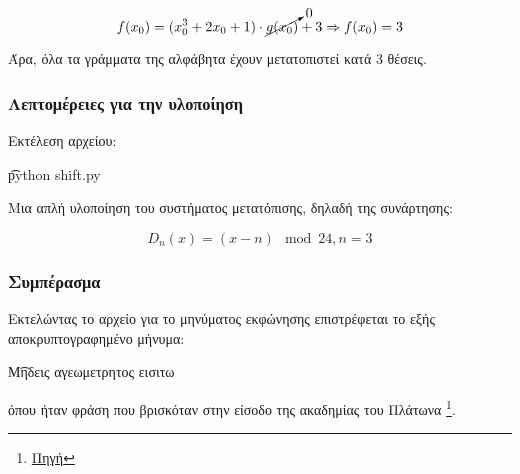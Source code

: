 \begin{equation} \label{eq:123}
    f(x_0) = (x_{0}^3+2x_0+1) \cdot \cancelto{0}{g(x_0)} + 3 \Rightarrow f(x_0) = 3
\end{equation}

Άρα, όλα τα γράμματα της αλφάβητα έχουν μετατοπιστεί κατά 3 θέσεις.

\subsubsection{Λεπτομέρειες για την υλοποίηση}

Εκτέλεση αρχείου:

\begin{center}
    \t{python shift.py}
\end{center}

Μια απλή υλοποίηση του συστήματος μετατόπισης, δηλαδή της συνάρτησης:

\begin{equation}
    D_n(x) = (x - n) \mod 24, n = 3
\end{equation}

\subsubsection{Συμπέρασμα}

Εκτελώντας το αρχείο για το μηνύματος εκφώνησης επιστρέφεται το εξής αποκρυπτογραφημένο μήνυμα:

\begin{center}
    \t{Μηδεις αγεωμετρητος εισιτω}
\end{center}

όπου ήταν φράση που βρισκόταν στην είσοδο της ακαδημίας του Πλάτωνα \footnote{\href{https://math.uoi.gr/images/pdf/mathclub/Leshi_12042016.pdf}{Πηγή}}.